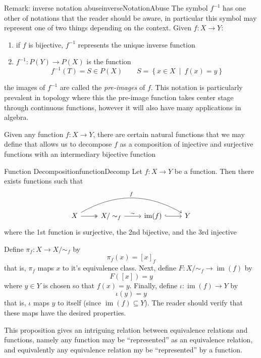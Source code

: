 \documentclass{book}
\newcommand{\im}{{\operatorname{im}}}
\newcommand{\sse}{\subseteq}
\newcommand{\set}[2]{\left\{#1 \ \middle|\ #2\right\}}
\begin{document}
\begin{titledBox}{Remark: inverse notation abuse}{inverseNotationAbuse}
	The symbol $f^{-1}$ has one other  of notations that the reader should be aware, in particular this
	symbol may represent one of two things depending on the context. Given $f: X \to Y$:
	\begin{enumerate}
		\item if $f$ is bijective, $f^{-1}$ represents the unique inverse function
		\item $f^{-1}: P(Y) \to P(X)$ is the function
			\[
				f^{-1}(T) = S \in P(X) \qquad S = \set{x \in X}{f(x) = y}
			\]
	\end{enumerate}
	the images of $f^{-1}$ are called the \emph{pre-images} of $f$. This notation is particularly prevalent in
	topology where this the pre-image function takes center stage through continuous functions, however it
	will also have many applications in algebra.
\end{titledBox}

Given any function $f: X \to Y$, there are certain natural functions that we may define that allows us to
decompose $f$ as a composition of injective and surjective functions with an intermediary bijective function

\begin{prop}{Function Decomposition}{functionDecomp}
	Let $f: X \to Y$ be a function. Then there exists functions such that
	\[
\begin{tikzcd}
X \arrow[r, two heads] \arrow[rrr, "f", bend left] & X/\sim_f \arrow[r, "\sim"] & \im(f) \arrow[r, hook] & Y
\end{tikzcd}
	\]
	where the 1st function is surjective, the 2nd bijective, and the 3rd injective
\end{prop}

\begin{Proof}
	Define $\pi_f: X \to X/\sim_f$ by
	\[
		\pi_f(x) = [x]_f
	\]
	that is, $\pi_f$ maps $x$ to it's equivalence class. Next, define $F: X/\sim_f \to \im(f)$ by
	\[
		F([x]) = y
	\]
	where $y\in Y$ is chosen so that $f(x) = y$. Finally, define $\iota: \im(f) \to Y$ by
	\[
		\iota(y) = y
	\]
	that is, $\iota$ maps $y$ to itself (since $\im(f) \sse Y$). The reader should verify that these maps have
	the desired properties.
\end{Proof}

This proposition gives an intriguing relation between equivalence relations and functions, namely any function
may be ``represented'' as an equivalence relation, and equivalently any equivalence relation my be
``represented'' by a function.
\end{document}
